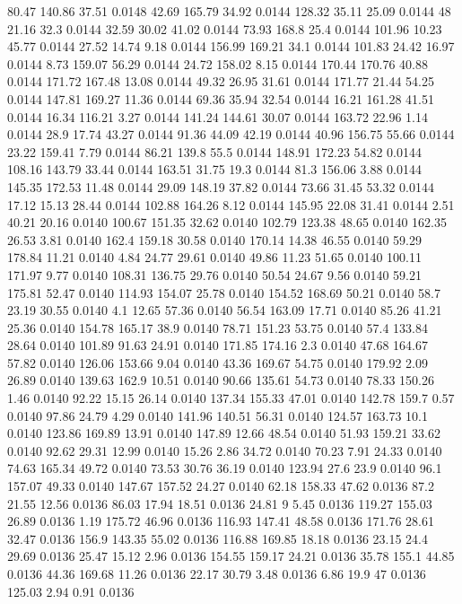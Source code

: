 80.47	140.86	37.51	0.0148
42.69	165.79	34.92	0.0144
128.32	35.11	25.09	0.0144
48	21.16	32.3	0.0144
32.59	30.02	41.02	0.0144
73.93	168.8	25.4	0.0144
101.96	10.23	45.77	0.0144
27.52	14.74	9.18	0.0144
156.99	169.21	34.1	0.0144
101.83	24.42	16.97	0.0144
8.73	159.07	56.29	0.0144
24.72	158.02	8.15	0.0144
170.44	170.76	40.88	0.0144
171.72	167.48	13.08	0.0144
49.32	26.95	31.61	0.0144
171.77	21.44	54.25	0.0144
147.81	169.27	11.36	0.0144
69.36	35.94	32.54	0.0144
16.21	161.28	41.51	0.0144
16.34	116.21	3.27	0.0144
141.24	144.61	30.07	0.0144
163.72	22.96	1.14	0.0144
28.9	17.74	43.27	0.0144
91.36	44.09	42.19	0.0144
40.96	156.75	55.66	0.0144
23.22	159.41	7.79	0.0144
86.21	139.8	55.5	0.0144
148.91	172.23	54.82	0.0144
108.16	143.79	33.44	0.0144
163.51	31.75	19.3	0.0144
81.3	156.06	3.88	0.0144
145.35	172.53	11.48	0.0144
29.09	148.19	37.82	0.0144
73.66	31.45	53.32	0.0144
17.12	15.13	28.44	0.0144
102.88	164.26	8.12	0.0144
145.95	22.08	31.41	0.0144
2.51	40.21	20.16	0.0140
100.67	151.35	32.62	0.0140
102.79	123.38	48.65	0.0140
162.35	26.53	3.81	0.0140
162.4	159.18	30.58	0.0140
170.14	14.38	46.55	0.0140
59.29	178.84	11.21	0.0140
4.84	24.77	29.61	0.0140
49.86	11.23	51.65	0.0140
100.11	171.97	9.77	0.0140
108.31	136.75	29.76	0.0140
50.54	24.67	9.56	0.0140
59.21	175.81	52.47	0.0140
114.93	154.07	25.78	0.0140
154.52	168.69	50.21	0.0140
58.7	23.19	30.55	0.0140
4.1	12.65	57.36	0.0140
56.54	163.09	17.71	0.0140
85.26	41.21	25.36	0.0140
154.78	165.17	38.9	0.0140
78.71	151.23	53.75	0.0140
57.4	133.84	28.64	0.0140
101.89	91.63	24.91	0.0140
171.85	174.16	2.3	0.0140
47.68	164.67	57.82	0.0140
126.06	153.66	9.04	0.0140
43.36	169.67	54.75	0.0140
179.92	2.09	26.89	0.0140
139.63	162.9	10.51	0.0140
90.66	135.61	54.73	0.0140
78.33	150.26	1.46	0.0140
92.22	15.15	26.14	0.0140
137.34	155.33	47.01	0.0140
142.78	159.7	0.57	0.0140
97.86	24.79	4.29	0.0140
141.96	140.51	56.31	0.0140
124.57	163.73	10.1	0.0140
123.86	169.89	13.91	0.0140
147.89	12.66	48.54	0.0140
51.93	159.21	33.62	0.0140
92.62	29.31	12.99	0.0140
15.26	2.86	34.72	0.0140
70.23	7.91	24.33	0.0140
74.63	165.34	49.72	0.0140
73.53	30.76	36.19	0.0140
123.94	27.6	23.9	0.0140
96.1	157.07	49.33	0.0140
147.67	157.52	24.27	0.0140
62.18	158.33	47.62	0.0136
87.2	21.55	12.56	0.0136
86.03	17.94	18.51	0.0136
24.81	9	5.45	0.0136
119.27	155.03	26.89	0.0136
1.19	175.72	46.96	0.0136
116.93	147.41	48.58	0.0136
171.76	28.61	32.47	0.0136
156.9	143.35	55.02	0.0136
116.88	169.85	18.18	0.0136
23.15	24.4	29.69	0.0136
25.47	15.12	2.96	0.0136
154.55	159.17	24.21	0.0136
35.78	155.1	44.85	0.0136
44.36	169.68	11.26	0.0136
22.17	30.79	3.48	0.0136
6.86	19.9	47	0.0136
125.03	2.94	0.91	0.0136
